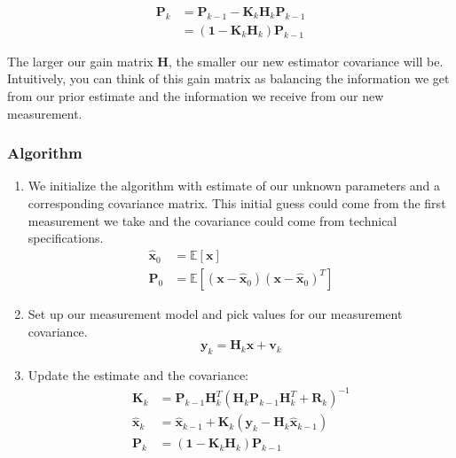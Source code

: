 \documentclass{article}
\begin{document}
\begin{equation}
\begin{aligned} \mathbf{P}_{k} &=\mathbf{P}_{k-1}-\mathbf{K}_{k} \mathbf{H}_{k} \mathbf{P}_{k-1} \\ &=\left(\mathbf{1}-\mathbf{K}_{k} \mathbf{H}_{k}\right) \mathbf{P}_{k-1} \end{aligned}
\end{equation}

The larger our gain matrix $\mathbf{H}$, the smaller our new estimator covariance will be. Intuitively, you can think of this gain matrix as balancing the information we get from our prior estimate and the information we receive from our new measurement. 


\subsubsection*{Algorithm}
\begin{enumerate}
\item We initialize the algorithm with estimate of our unknown parameters and a corresponding covariance matrix. This initial guess could come from the first measurement we take and the covariance could come from technical specifications.
\begin{equation}
\begin{aligned} \hat{\mathbf{x}}_{0} &=\mathbb{E}[\mathbf{x}] \\ \mathbf{P}_{0} &=\mathbb{E}\left[\left(\mathbf{x}-\hat{\mathbf{x}}_{0}\right)\left(\mathbf{x}-\hat{\mathbf{x}}_{0}\right)^{T}\right] \end{aligned}
\end{equation}
\item Set up our measurement model and pick values for our measurement covariance.
\begin{equation}
\mathbf{y}_{k}=\mathbf{H}_{k} \mathbf{x}+\mathbf{v}_{k}
\end{equation}

\item Update the estimate and the covariance:
\begin{equation}
\begin{aligned} \mathbf{K}_{k} &=\mathbf{P}_{k-1} \mathbf{H}_{k}^{T}\left(\mathbf{H}_{k} \mathbf{P}_{k-1} \mathbf{H}_{k}^{T}+\mathbf{R}_{k}\right)^{-1} \\ \hat{\mathbf{x}}_{k} &=\hat{\mathbf{x}}_{k-1}+\mathbf{K}_{k}\left(\mathbf{y}_{k}-\mathbf{H}_{k} \hat{\mathbf{x}}_{k-1}\right) \\ \mathbf{P}_{k} &=\left(\mathbf{1}-\mathbf{K}_{k} \mathbf{H}_{k}\right) \mathbf{P}_{k-1} 
\end{aligned}
\end{equation}

\end{enumerate}
\end{document}
